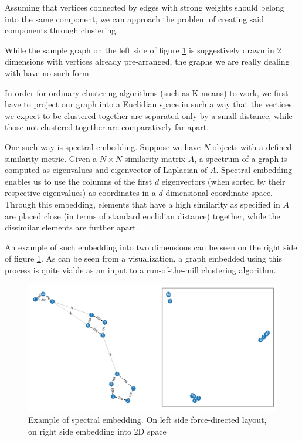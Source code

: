Assuming that vertices connected by edges with strong weights should belong into the same component, we can approach the problem of creating said components through clustering.


While the sample graph on the left side of figure \ref{fig:spectral_example} is suggestively drawn in 2 dimensions with vertices already pre-arranged, the graphs we are really dealing with have no such form.


In order for ordinary clustering algorithms (such as K-means) to work, we first have to project our graph into a Euclidian space in such a way that the vertices we expect to be clustered together are separated only by a small distance, while those not clustered together are comparatively far apart.


One such way is spectral embedding\cite{luo2003spectral}. Suppose we have $N$ objects with a defined similarity metric. Given a $N \times N$ similarity matrix $A$, a spectrum of a graph is computed as eigenvalues and eigenvector of Laplacian of $A$. 
Spectral embedding enables us to use the columns of the first $d$ eigenvectors (when sorted by their respective eigenvalues) as coordinates in a $d$-dimensional coordinate space. 
Through this embedding, elements that have a high similarity as specified in $A$ are placed close (in terms of standard euclidian distance) together, while the dissimilar elements are further apart.

An example of such embedding into two dimensions can be seen on the right side of figure \ref{fig:spectral_example}.
As can be seen from a visualization, a graph embedded using this process is quite viable as an input to a run-of-the-mill clustering algorithm.

\begin{figure}
\includegraphics[width=400bp]{figures/spectral_example.png}

\caption{Example of spectral embedding. On left side force-directed layout, on right side embedding into 2D space}
\label{fig:spectral_example}
\end{figure}


